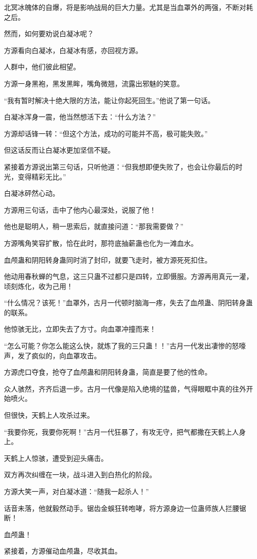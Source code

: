 \begin{this_body}
北冥冰魄体的自爆，将是影响战局的巨大力量。尤其是当血罩外的两强，不断对耗之后。

然而，如何要劝说白凝冰呢？

方源看向白凝冰，白凝冰有感，亦回视方源。

人群中，他们彼此相望。

方源一身黑袍，黑发黑眸，嘴角微翘，流露出邪魅的笑意。

“我有暂时解决十绝大限的方法，能让你起死回生。”他说了第一句话。

白凝冰浑身一震，他当然想活下去：“什么方法？”

方源却话锋一转：“但这个方法，成功的可能并不高，极可能失败。”

但这话反而让白凝冰更加坚信不疑。

紧接着方源说出第三句话，只听他道：“但我想即便失败了，也会让你最后的时光，变得精彩无比。”

白凝冰砰然心动。

方源用三句话，击中了他内心最深处，说服了他！

他也是聪明人，稍一思索后，就直接问道：“那我需要做？”

方源嘴角笑容扩散，恰在此时，那符底抽薪蛊也化为一滩血水。

血颅蛊和阴阳转身蛊同时消了封印，就要飞走时，被方源死死扣住。

他动用春秋蝉的气息，这三只蛊不过都只是四转，立即慑服。方源再用真元一灌，顷刻炼化，收为己用！

“什么情况？该死！”血罩外，古月一代顿时脑海一疼，失去了血颅蛊、阴阳转身蛊的联系。

他惊骇无比，立即失去了方寸。向血罩冲撞而来！

“怎么可能？你怎么能这么快，就炼了我的三只蛊！！”古月一代发出凄惨的怒嚎声，发了疯似的，向血罩攻击。

方源虎口夺食，抢夺了血颅蛊和阴阳转身蛊，简直是要了他的性命。

众人骇然，齐齐后退一步。古月一代像是陷入绝境的猛兽，气得眼眶中真的往外开始喷火。

但很快，天鹤上人攻杀过来。

“我要你死，我要你死啊！”古月一代狂暴了，有攻无守，把气都撒在天鹤上人身上。

天鹤上人惊骇，遭受到迎头痛击。

双方再次纠缠在一块，战斗进入到白热化的阶段。

方源大笑一声，对白凝冰道：“随我一起杀人！”

话音未落，他就毅然动手。锯齿金蜈狂转咆哮，将方源身边一位蛊师族人拦腰锯断！

血颅蛊！

紧接着，方源催动血颅蛊，尽收其血。

\end{this_body}

